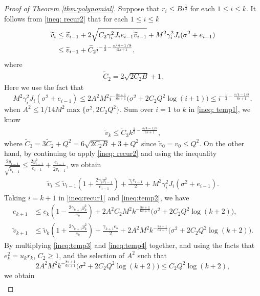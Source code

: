 \begin{proof}[Proof of Theorem \ref{thm:polynomial}]
Suppose that $r_i \leq Bi^{\frac{1}{4}}$ for each $1\leq i \leq k$. It follows from \eqref{ineq: recur2} that for each $1\leq i\leq k$
\begin{align}
    \tilde v_i &\leq \tilde v_{i-1} + 2\sqrt{C_2\gamma_i^2J_{i}e_{i-1}\tilde v_{i-1}} +  M^2\gamma_i^2J_i(\sigma^2 + e_{i-1}) \notag\\
    &\leq \tilde v_{i-1} + \tilde C_2i^{-\frac{1}{2}-\frac{s/4 - 1/8}{6s+1}}, \label{ineq: temp1}
\end{align}
where 
\begin{align*}
    \tilde C_2 = 2\sqrt{2C_2B} + 1.
\end{align*}
Here we use the fact that $$M^2\gamma_i^2J_i(\sigma^2 + e_{i-1}) \leq 2A^2M^2i^{-\frac{8s+1}{6s+1}}\big(\sigma^2 + 2C_2Q^2\log(i+1)\big) \leq i^{-\frac{1}{2}-\frac{s/4 - 1/8}{6s+1}},$$
when $A^2 \leq 1/14M^2\max\{\sigma^2, 2C_2Q^2\}$.  Sum over $i=1$ to $k$ in \eqref{ineq: temp1}, we know 
\begin{align}
    \tilde v_k \leq \tilde C_3 k^{\frac{1}{2}-\frac{s/4 - 1/8}{6s+1}}, \label{ineq:vk}
\end{align}
where $\tilde C_3 = 3\tilde C_2 + Q^2 = 6\sqrt{2C_2B} + 3 + Q^2$ since $\tilde v_0 = v_0 \leq Q^2$. On the other hand, by continuing to apply \eqref{ineq: recur2} and using the inequality $\frac{2y_{i-1}}{\sqrt{\tilde v_{i-1}}} \leq \frac{2y_{i-1}^2}{e_{i-1}} + \frac{e_{i-1}}{2\tilde v_{i-1}}$, we obtain
\begin{align}
    \tilde v_i \leq \tilde v_{i-1}\left(1+ \frac{2\gamma_iy_{i-1}^2}{e_{i-1}}\right) + \frac{\gamma_i e_{i-1}}{2}  + M^2\gamma_i^2J_i(\sigma^2 + e_{i-1}). \label{ineq:temp2}
\end{align}
Taking $i = k+1$ in \eqref{ineq:recur1} and  \eqref{ineq:temp2}, we have
\begin{align}
    e_{k+1} &\leq e_k\left(1- \frac{2\gamma_{k+1}y_k^2}{e_k} \right) + 2A^2C_2M^2k^{-\frac{8s+1}{6s+1}}\big(\sigma^2 + 2C_2Q^2\log(k+2)\big), \label{ineq:temp3}\\
    \tilde v_{k+1} &\leq \tilde v_{k}\left(1+ \frac{2\gamma_{k+1}y_{k}^2}{e_{k}}\right) + \frac{\gamma_{k+1} e_{k}}{2}  + 2A^2M^2k^{-\frac{8s+1}{6s+1}}\big(\sigma^2 + 2C_2Q^2\log(k+2)\big). \label{ineq:temp4}
\end{align}
By multiplying \eqref{ineq:temp3} 
and \eqref{ineq:temp4} together, and using the facts that $e_k^2 = u_kr_k$, $C_2 \geq 1$, and the selection of $A^2$ such that 
$$
2A^2M^2k^{-\frac{8s+1}{6s+1}}\big(\sigma^2 + 2C_2Q^2\log(k+2)\big) \leq C_2Q^2\log(k+2),
$$
we obtain
\begin{align}

\end{align}
\end{proof}
